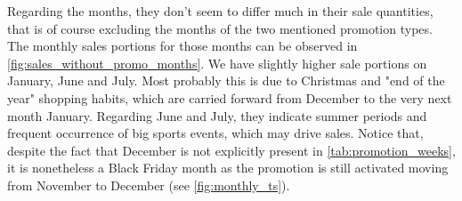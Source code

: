 Regarding the months, they don't seem to differ much in their sale quantities, that is of course excluding the months of the two mentioned promotion types. The monthly sales portions for those months can be observed in \autoref{fig:sales_without_promo_months}. We have slightly higher sale portions on January, June and July. 
Most probably this is due to Christmas and "end of the year" shopping habits, which are carried forward from December to the very next month January. 
Regarding June and July, they indicate summer periods and frequent occurrence of big sports events, which may drive sales. 
Notice that, despite the fact that December is not explicitly present in \autoref{tab:promotion_weeks}, it is nonetheless a Black Friday month as the promotion is still activated moving from November to December (see \autoref{fig:monthly_ts}). 
\\


